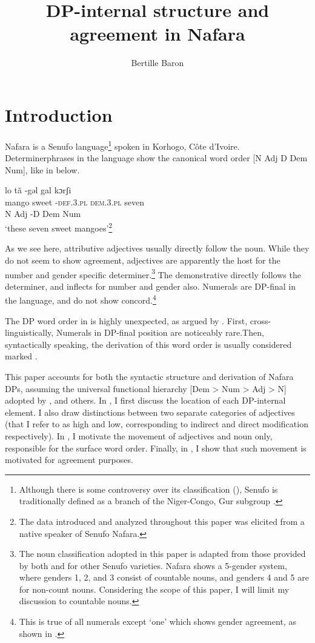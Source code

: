 \documentclass[output=paper]{langscibook}
\author{Bertille Baron\affiliation{Georgetown University}}
\title{DP-internal structure and agreement in Nafara}
\begin{document}
  

\section{Introduction}

Nafara is a Senufo language\footnote{Although there is some controversy over its classification (\citealt{Manessy1975,Naden1989}), Senufo is traditionally defined as a branch of the Niger-Congo, Gur subgroup \citep{Westermann1970,BendorSamuel1971}.} spoken in Korhogo, Côte d’Ivoire. Determiner\linebreak phrases in the language show the canonical word order [N Adj D Dem Num], like in  below. 


\ea
\glll lo  tã -gəl  gal kɔrʃi \label{ex:baron:1}\\
      mango sweet -\textsc{def.3.pl} \textsc{dem.3.pl} seven\\
      N Adj -D Dem Num\\
\glt `these seven sweet mangoes'\footnote{The data introduced and analyzed throughout this paper was elicited from a native speaker of Senufo Nafara.}
\z

As we see here, attributive adjectives usually directly follow the noun. While they do not seem to show agreement, adjectives are apparently the host for the number and gender specific determiner.\footnote{The noun classification adopted in this paper is adapted from those provided by both \citet[22]{Manessy1996} and \citet[76]{Carlson1990} for other Senufo varieties. Nafara shows a 5-gender system, where genders 1, 2, and 3 consist of countable nouns, and genders 4 and 5 are for non-count nouns. Considering the scope of this paper, I will limit my discussion to countable nouns.} The demonstrative directly follows the determiner, and inflects for number and gender also. Numerals are DP-final in the language, and do not show concord.\footnote{This is true of all numerals except ‘one’ which shows gender agreement, as shown in .}

The DP word order in  is highly unexpected, as argued by \citet{Cinque2005}. First, cross-linguistically, Numerals in DP-final position are noticeably rare.\linebreak Then, syntactically speaking, the derivation of this word order is usually considered marked \citep{Cinque2005}.

This paper accounts for both the syntactic structure and derivation of Nafara DPs, assuming the universal functional hierarchy [Dem > Num > Adj > N] adopted by \citet{Greenberg1963}, \citet{Cinque2005} and others. In , I first discuss the location of each DP-internal element. I also draw distinctions between two separate categories of adjectives (that I refer to as high and low, corresponding to   indirect and direct modification respectively). In , I motivate the movement of adjectives and noun only, responsible for the surface word order. Finally, in , I show that such movement is motivated for agreement purposes.
\end{document}
